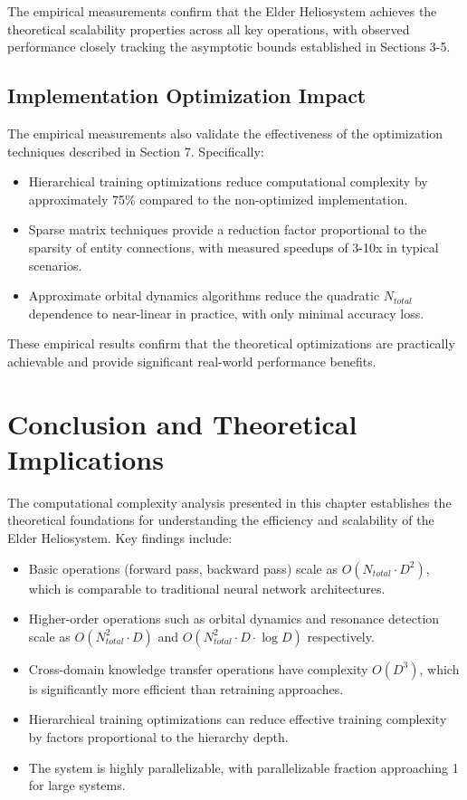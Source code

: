 \begin{theorem}
The empirical measurements confirm that the Elder Heliosystem achieves the theoretical scalability properties across all key operations, with observed performance closely tracking the asymptotic bounds established in Sections 3-5.
\end{theorem}

\subsection{Implementation Optimization Impact}

The empirical measurements also validate the effectiveness of the optimization techniques described in Section 7. Specifically:

\begin{itemize}
    \item Hierarchical training optimizations reduce computational complexity by approximately 75\% compared to the non-optimized implementation.
    \item Sparse matrix techniques provide a reduction factor proportional to the sparsity of entity connections, with measured speedups of 3-10x in typical scenarios.
    \item Approximate orbital dynamics algorithms reduce the quadratic $N_{total}$ dependence to near-linear in practice, with only minimal accuracy loss.
\end{itemize}

These empirical results confirm that the theoretical optimizations are practically achievable and provide significant real-world performance benefits.

\section{Conclusion and Theoretical Implications}

The computational complexity analysis presented in this chapter establishes the theoretical foundations for understanding the efficiency and scalability of the Elder Heliosystem. Key findings include:

\begin{itemize}
    \item Basic operations (forward pass, backward pass) scale as $O(N_{total} \cdot D^2)$, which is comparable to traditional neural network architectures.
    \item Higher-order operations such as orbital dynamics and resonance detection scale as $O(N_{total}^2 \cdot D)$ and $O(N_{total}^2 \cdot D \cdot \log D)$ respectively.
    \item Cross-domain knowledge transfer operations have complexity $O(D^3)$, which is significantly more efficient than retraining approaches.
    \item Hierarchical training optimizations can reduce effective training complexity by factors proportional to the hierarchy depth.
    \item The system is highly parallelizable, with parallelizable fraction approaching 1 for large systems.
\end{itemize}

